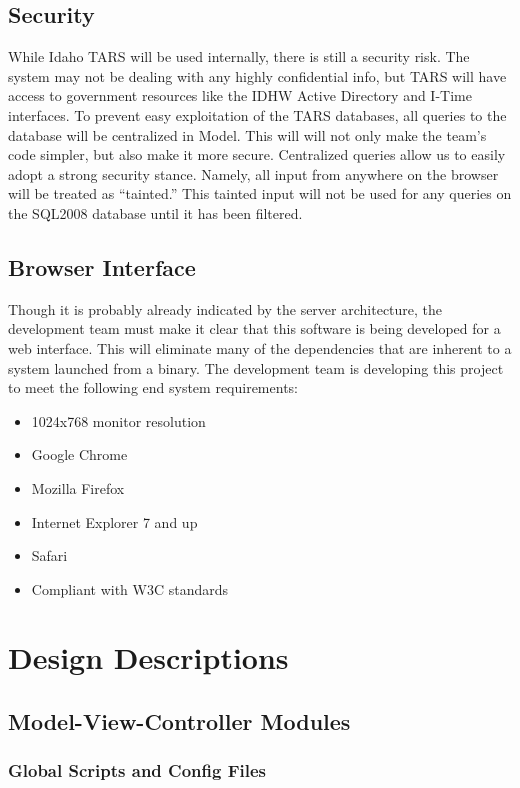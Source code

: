 \documentclass[letterpaper]{article}
\begin{document}
\subsection{Security}
While Idaho TARS will be used internally, there is still a security risk. The system may not be dealing with any highly confidential info, but TARS will have access to government resources like the IDHW Active Directory and I-Time interfaces. To prevent easy exploitation of the TARS databases, all queries to the database will be centralized in Model. This will will not only make the team's code simpler, but also make it more secure. Centralized queries allow us to easily adopt a strong security stance. Namely, all input from anywhere on the browser will be treated as ``tainted.'' This tainted input will not be used for any queries on the SQL2008 database until it has been filtered.


\subsection{Browser Interface}
Though it is probably already indicated by the server architecture, the development team must make it clear that this software is being developed for a web interface. This will eliminate many of the dependencies that are inherent to a system launched from a binary. The development team is developing this project to meet the following end system requirements:
\begin{itemize}
\item 1024x768 monitor resolution
\item Google Chrome
\item Mozilla Firefox
\item Internet Explorer 7 and up
\item Safari
\item Compliant with W3C standards
\end{itemize}
\section{Design Descriptions}
\subsection{Model-View-Controller Modules}
\subsubsection{Global Scripts and Config Files}
\end{document}
